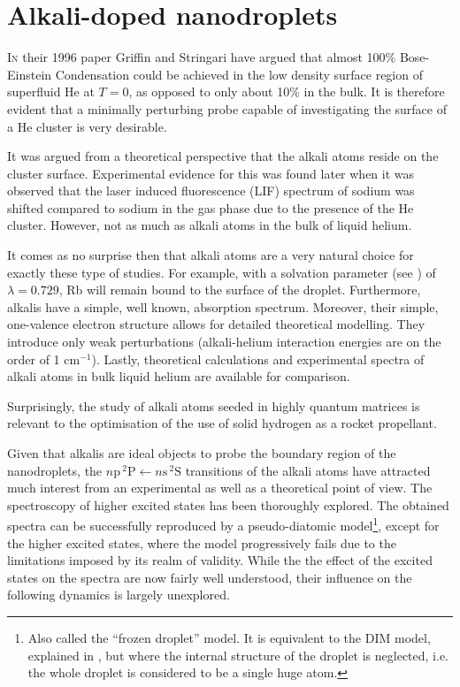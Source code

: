 \chapter{Alkali-doped nanodroplets}

	\lettrine[lines=4,findent=3pt,nindent=0pt]{\color{activeColor}I}{n} their 1996 paper\citep{Griffin1996} Griffin and Stringari have argued that almost 100\% Bose-Einstein Condensation could be achieved in the low density surface region of superfluid He at $T=0$, as opposed to only about 10\% in the bulk. It is therefore evident that a minimally perturbing probe capable of investigating the surface of a He cluster is very desirable.

	It was argued from a theoretical perspective\citep{Dalfovo1994} that the alkali atoms reside on the cluster surface. Experimental evidence for this was found\citep{Stienkemeier1995-1,Stienkemeier1995-2,Ancilotto1995-1} later when it was observed that the laser induced fluorescence (LIF) spectrum of sodium was shifted compared to sodium in the gas phase due to the presence of the He cluster. However, not as much as alkali atoms in the bulk of liquid helium.
	
	It comes as no surprise then that alkali atoms are a very natural choice for exactly these type of studies.  For example, with a solvation parameter (see ) of $\lambda=0.729$\citep{Anc95}, Rb will remain bound to the surface of the droplet. Furthermore, alkalis have a simple, well known, absorption spectrum. Moreover, their simple, one-valence electron structure allows for detailed theoretical modelling. They introduce only weak perturbations (alkali-helium interaction energies are on the order of 1 cm$^{-1}$\citep{Pat91}). Lastly, theoretical calculations\citep{Ancilotto1995-2,Kanorsky1994} and experimental spectra\citep{Tabbert1995,Takahashi1993,Beijersbergen1993} of alkali atoms in bulk liquid helium are available for comparison.

	Surprisingly, the study of alkali atoms seeded in highly quantum matrices is relevant to the optimisation of the use of solid hydrogen as a rocket propellant\citep{Carrick1993}.
	
	Given that alkalis are ideal objects to probe the boundary region of the nanodroplets, the $n\mathrm{p}\,^2\mathrm{P}\!\longleftarrow\!n\mathrm{s}\,^2\mathrm{S}$ transitions of the alkali atoms have attracted much interest from an experimental as well as a theoretical point of view. The spectroscopy of higher excited states has been thoroughly explored\citep{Log11b,Log11a,Lackner2012,Lackner2013,The11,Fec12,Pif10,Lac11,Theisen2011,Lac13}. The obtained spectra can be successfully reproduced by a pseudo-diatomic model\footnote{Also called the ``frozen droplet'' model. It is equivalent to the DIM model, explained in , but where the internal structure of the droplet is neglected, i.e. the whole droplet is considered to be a single huge atom.}, except for the higher excited states, where the model progressively fails due to the limitations imposed by its realm of validity\citep{Sti96,Bunermann2007}. While the the effect of the excited states on the spectra are now fairly well understood, their influence on the following dynamics is largely unexplored.
	
